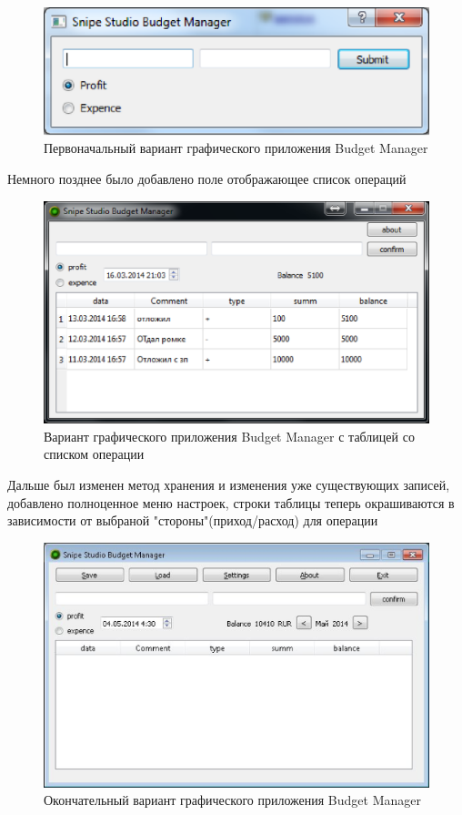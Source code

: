\begin{figure}[H]
	\centering
	\includegraphics[width=0.7\linewidth]{pics/firstVersion.eps}
	\caption{Первоначальный вариант графического приложения Budget Manager}
	\label{fig:firstVersion}
\end{figure}

Немного позднее было добавлено поле отображающее список операций

\begin{figure}[H]
	\centering
	\includegraphics[width=0.7\linewidth]{pics/secondVersion.eps}
	\caption{Вариант графического приложения Budget Manager с таблицей со списком
		операции}
	\label{fig:secondVersion}
\end{figure}

Дальше был изменен метод хранения и изменения уже существующих записей, добавлено полноценное меню настроек, строки таблицы теперь окрашиваются в зависимости от выбраной "стороны"(приход/расход) для операции

\begin{figure}[H]
	\centering
	\includegraphics[width=0.7\linewidth]{pics/view1.eps}
	\caption{Окончательный вариант графического приложения Budget Manager}
	\label{fig:view1}
\end{figure}

